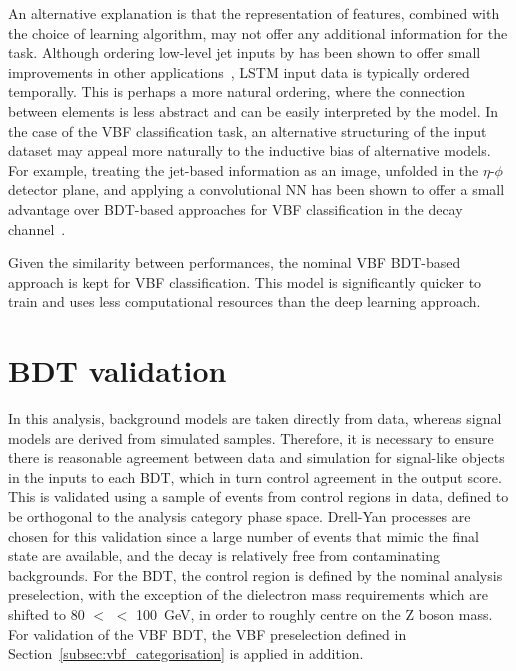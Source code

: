 An alternative explanation is that the representation of features, combined with the choice of learning algorithm, may not offer any additional information for the task. Although ordering low-level jet inputs by \pt has been shown to offer small improvements in other applications~\cite{tthCouplings}, LSTM input data is typically ordered temporally. This is perhaps a more natural ordering, where the connection between elements is less abstract and can be easily interpreted by the model. In the case of the VBF classification task, an alternative structuring of the input dataset may appeal more naturally to the inductive bias of alternative models. For example, treating the jet-based information as an image, unfolded in the $\eta$-$\phi$ detector plane, and applying a convolutional NN has been shown to offer a small advantage over BDT-based approaches for VBF classification in the \Hgg decay channel~\cite{jack_thesis}. 

Given the similarity between performances, the nominal VBF BDT-based approach is kept for VBF classification. This model is significantly quicker to train and uses less computational resources than the deep learning approach.


\section{BDT validation}

In this analysis, background models are taken directly from data, whereas signal models are derived from simulated samples. Therefore, it is necessary to ensure there is reasonable agreement between data and simulation for signal-like objects in the inputs to each BDT, which in turn control agreement in the output score. 
This is validated using a sample of \Zee events from control regions in data, defined to be orthogonal to the analysis category phase space. Drell-Yan processes are chosen for this validation since a large number of events that mimic the \Hee final state are available, and the decay is relatively free from contaminating backgrounds. For the \ggH BDT, the control region is defined by the nominal analysis preselection, with the exception of the dielectron mass requirements which are shifted to 80 $<$ \mee $<$ 100~GeV, in order to roughly centre on the $\mathrm{Z}$ boson mass.
For validation of the VBF BDT, the VBF preselection defined in Section~\ref{subsec:vbf_categorisation} is applied in addition.

